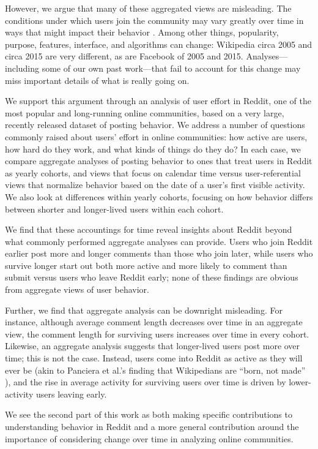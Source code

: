 However, we argue that many of these aggregated views are misleading. The conditions under which users join the community may vary greatly over time in ways that might impact their behavior \cite{Miller2015}.  Among other things, popularity, purpose, features, interface, and algorithms can change: Wikipedia circa 2005 and circa 2015 are very different, as are Facebook of 2005 and 2015.  Analyses---including some of our own past work---that fail to account for this change may miss important details of what is really going on.

We support this argument through an analysis of user effort in Reddit, one of the most popular and long-running online communities, based on a very large, recently released dataset of posting behavior.  We address a number of questions commonly raised about users' effort in online communities: how active are users, how hard do they work, and what kinds of things do they do?  In each case, we compare aggregate analyses of posting behavior to ones that treat users in Reddit as yearly cohorts, and views that focus on calendar time versus user-referential views that normalize behavior based on the date of a user's first visible activity.  We also look at differences within yearly cohorts, focusing on how behavior differs between shorter and longer-lived users within each cohort.

We find that these accountings for time reveal insights about Reddit beyond what commonly performed aggregate analyses can provide.  Users who join Reddit earlier post more and longer comments than those who join later, while users who survive longer start out both more active and more likely to comment than submit versus users who leave Reddit early; none of these findings are obvious from aggregate views of user behavior.  

Further, we find that aggregate analysis can be downright misleading.  For instance, although average comment length decreases over time in an aggregate view, the comment length for surviving users increases over time in every cohort.  Likewise, an aggregate analysis suggests that longer-lived users post more over time; this is not the case.  Instead, users come into Reddit as active as they will ever be (akin to Panciera et al.'s finding that Wikipedians are ``born, not made'' \cite{Panciera2009}), and the rise in average activity for surviving users over time is driven by lower-activity users leaving early.

We see the second part of this work as both making specific contributions to understanding behavior in Reddit and a more general contribution around the importance of considering change over time in analyzing online communities. 

